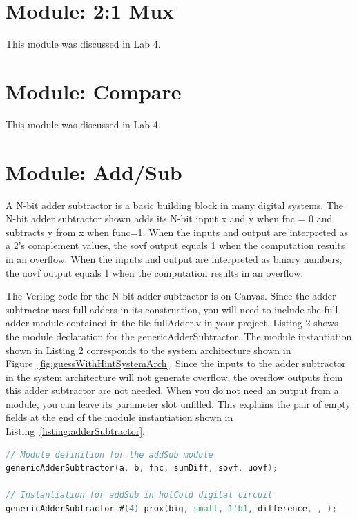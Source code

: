 \section{Module: 2:1 Mux}
This module was discussed in Lab 4.

\section{Module: Compare}
This module was discussed in Lab 4.

\section{Module: Add/Sub }

A N-bit adder subtractor is a basic building block in many digital
systems. The N-bit adder subtractor shown adds its N-bit
input x and y when fnc = 0 and subtracts y from x when func=1. When
the inputs and output are interpreted as a 2's complement values, the
sovf output equals 1 when the computation results in an overflow. When
the inputs and output are interpreted as binary numbers, the uovf output
equals 1 when the computation results in an overflow.

The Verilog code for the N-bit adder subtractor is on Canvas. Since the
adder subtractor uses full-adders in its construction, you will need to
include the full adder module contained in the file fullAdder.v in your
project. Listing 2 shows the module declaration for the genericAdderSubtractor.
The module
instantiation shown in Listing 2 corresponds to the system architecture
shown in Figure~\ref{fig:guessWithHintSystemArch}. Since the inputs to the adder subtractor in the
system architecture will not generate overflow, the overflow outputs
from this adder subtractor are not needed. When you do not need an
output from a module, you can leave its parameter slot unfilled. This
explains the pair of empty fields at the end of the module instantiation
shown in Listing~\ref{listing:adderSubtractor}.

\begin{lstlisting}[language=Verilog,
 caption={Top, module definition for an adder subtractor.  Bottom, module instantation
 of the adder subtractor in Figure~\ref{fig:guessWithHintSystemArch}.},
 label={listing:adderSubtractor},
 frame=single]
// Module definition for the addSub module 
genericAdderSubtractor(a, b, fnc, sumDiff, sovf, uovf);

// Instantiation for addSub in hotCold digital circuit
genericAdderSubtractor #(4) prox(big, small, 1'b1, difference, , );
\end{lstlisting}

